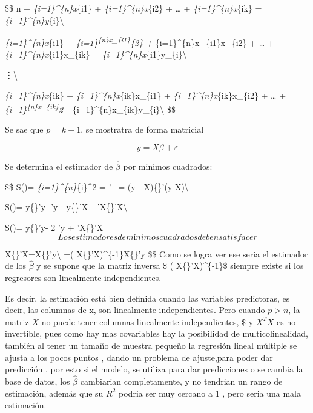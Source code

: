 \documentclass[
]{article}
\begin{document}
\$\$ n +
\sum\emph{\{i=1\}\^{}\{n\}x}\{i1\} +
\sum\emph{\{i=1\}\^{}\{n\}x}\{i2\} + \ldots{} +
\sum\emph{\{i=1\}\^{}\{n\}x}\{ik\} =
\sum\emph{\{i=1\}\^{}\{n\}y}\{i\}\textbackslash{}

\sum\emph{\{i=1\}\^{}\{n\}x}\{i1\} +
\sum\emph{\{i=1\}\textsuperscript{\{n\}x\_\{i1\}}\{2\}
+ \sum}\{i=1\}\^{}\{n\}x\_\{i1\}x\_\{i2\} + \ldots{}
+ \sum\emph{\{i=1\}\^{}\{n\}x}\{i1\}x\_\{ik\} =
\sum\emph{\{i=1\}\^{}\{n\}x}\{i1\}y\_\{i\}\textbackslash{}

\vdots  \textbackslash{}

\sum\emph{\{i=1\}\^{}\{n\}x}\{ik\} +
\sum\emph{\{i=1\}\^{}\{n\}x}\{ik\}x\_\{i1\} +
\sum\emph{\{i=1\}\^{}\{n\}x}\{ik\}x\_\{i2\} +
\ldots{} +
\sum\emph{\{i=1\}\textsuperscript{\{n\}x\_\{ik\}}2
=\sum}\{i=1\}\^{}\{n\}x\_\{ik\}y\_\{i\}\textbackslash{} \$\$

Se sae que \(p = k + 1\), se mostratra de forma matricial

\[
y =X\beta + \varepsilon 
\]

Se determina el estimador de \(\widehat{\beta}\) por minimos cuadrados:

\$\$ S(\beta )= \sum\emph{\{i=1\}\^{}\{n\}\varepsilon }\{i\}\^{}2 =
\varepsilon {}' ~\varepsilon  = (y -
X\beta )\{\}'(y-X\beta )\textbackslash{}

S(\beta )= y\{\}'y- 'y - y\{\}'X\beta +
\beta {}'X\{\}'X\beta \textbackslash{}

S(\beta )= y\{\}'y- 2 'y + \beta {}'X\{\}'X\beta  \[
Los estimadores de mínimos cuadrados deben satisfacer 
\]

X\{\}'X\widehat{\beta }=X\{\}'y\textbackslash{} \widehat{\beta }=\left (
X\{\}'X\right )\^{}\{-1\}X\{\}'y \$\$ Como se logra ver ese seria el
estimador de los \(\widehat{\beta}\) y se supone que la matriz inversa
\$ \left ( X\{\}'X\right )\^{}\{-1\}\$ siempre existe si los regresores
son linealmente independientes.

Es decir, la estimación está bien definida cuando las variables
predictoras, es decir, las columnas de x, son linealmente
independientes. Pero cuando \(p> n\), la matriz \(X\) no puede tener
columnas linealmente independientes, \$ y \(X^{T}X\) es no invertible,
pues como hay mas covariables hay la posibilidad de multicolinealidad,
también al tener un tamaño de muestra pequeño la regresión lineal
múltiple se ajusta a los pocos puntos , dando un problema de ajuste,para
poder dar predicción , por esto si el modelo, se utiliza para dar
predicciones o se cambia la base de datos, los \(\widehat{\beta}\)
cambiarian completamente, y no tendrian un rango de estimación, además
que su \(R^{2}\) podria ser muy cercano a 1 , pero seria una mala
estimación.
\end{document}
